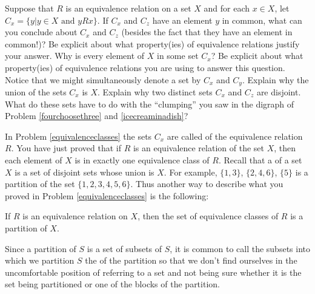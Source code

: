\item Suppose that $R$ is an equivalence relation on a set $X$
and for each $x\in X$, let $C_x = \{y| y\in X \mbox{ and }
yRx\}$.  If $C_x$ and
$C_z$ have an element $y$ in common, what can you conclude
about $C_x$ and $C_z$ (besides the fact that they have an
element in common!)?  Be explicit about what property(ies) of
equivalence relations justify your answer.  Why is every
element of
$X$ in some set
$C_x$?  Be explicit about what property(ies) of equivalence
relations you are using to answer this question.  Notice that
we might simultaneously denote a set by $C_x$ and $C_y$. 
Explain why the union of the sets $C_x$ is $X$.  Explain why
two distinct sets $C_x$ and $C_z$ are disjoint.  What do these
sets have to do with the ``clumping'' you saw in the digraph
of Problem \ref{fourchoosethree} and
\ref{icecreaminadish}?\label{equivalenceclasses}
\ep

In Problem \ref{equivalenceclasses} the sets $C_x$ are called
 of the equivalence
relation
$R$.  You have just proved that if
$R$ is an equivalence relation of the set $X$, then each
element of $X$ is in exactly one equivalence class of $R$.  
Recall that a  of a set
$X$ is a set of disjoint sets whose union is $X$.  For example,
$\{1,3\}$,
$\{2,4,6\}$, $\{5\}$ is a partition of the set
$\{1,2,3,4,5,6\}$.  Thus another way to describe what you
proved in Problem \ref{equivalenceclasses} is the following:
\begin{theorem} If $R$
is an equivalence relation on $X$, then the set of equivalence
classes of $R$ is a partition of $X$.
\end{theorem}
  Since a partition of
$S$ is a set of subsets of $S$, it is common to call the
subsets into which we partition $S$ the  of the partition so that we don't find ourselves
in the uncomfortable position of referring to a set and not being
sure whether it is the set being partitioned or one of the
blocks of the partition.


